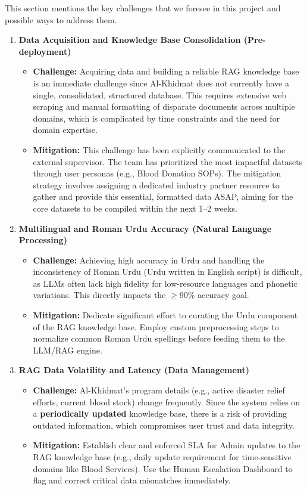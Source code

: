This section mentions the key challenges that we foresee in this project and possible ways to address them.
\begin{enumerate}
    \item \textbf{Data Acquisition and Knowledge Base Consolidation (Pre-deployment)}
    \begin{itemize}
        \item \textbf{Challenge:} Acquiring data and building a reliable RAG knowledge base is an immediate challenge since Al-Khidmat does not currently have a single, consolidated, structured database. This requires extensive web scraping and manual formatting of disparate documents across multiple domains, which is complicated by time constraints and the need for domain expertise.
        \item \textbf{Mitigation:} This challenge has been explicitly communicated to the external supervisor. The team has prioritized the most impactful datasets through user personas (e.g., Blood Donation SOPs). The mitigation strategy involves assigning a dedicated industry partner resource to gather and provide this essential, formatted data ASAP, aiming for the core datasets to be compiled within the next 1--2 weeks.
    \end{itemize}
    \item \textbf{Multilingual and Roman Urdu Accuracy (Natural Language Processing)}
    \begin{itemize}
        \item \textbf{Challenge:} Achieving high accuracy in Urdu and handling the inconsistency of Roman Urdu (Urdu written in English script) is difficult, as LLMs often lack high fidelity for low-resource languages and phonetic variations. This directly impacts the $\geq 90\%$ accuracy goal.
        \item \textbf{Mitigation:} Dedicate significant effort to curating the Urdu component of the RAG knowledge base. Employ custom preprocessing steps to normalize common Roman Urdu spellings before feeding them to the LLM/RAG engine.
    \end{itemize}

    \item \textbf{RAG Data Volatility and Latency (Data Management)}
    \begin{itemize}
        \item \textbf{Challenge:} Al-Khidmat's program details (e.g., active disaster relief efforts, current blood stock) change frequently. Since the system relies on a \textbf{periodically updated} knowledge base, there is a risk of providing outdated information, which compromises user trust and data integrity.
        \item \textbf{Mitigation:} Establish clear and enforced SLA for Admin updates to the RAG knowledge base (e.g., daily update requirement for time-sensitive domains like Blood Services). Use the Human Escalation Dashboard to flag and correct critical data mismatches immediately.
    \end{itemize}


\end{enumerate}
